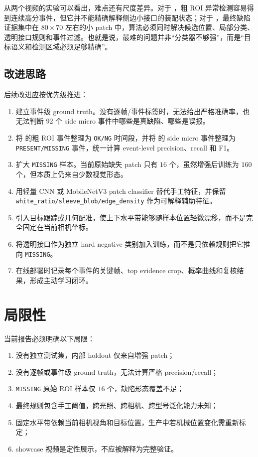 \documentclass[a4paper,12pt]{article}
\newcommand{\code}[1]{\texttt{#1}}
\begin{document}
从两个视频的实验可以看出，难点还有尺度差异。对于 ，粗 ROI 异常检测容易得到连续高分事件，但它并不能精确解释侧边小接口的装配状态；对于 ，最终缺陷证据集中在 $80\times70$ 左右的小 patch 中，算法必须同时解决候选位置、局部分类、透明接口规则和事件过滤。也就是说，最难的问题并非“分类器不够强”，而是“目标语义和检测区域必须足够精确”。

\subsection{改进思路}
后续改进应按优先级推进：
\begin{enumerate}[label=\arabic*.]
    \item 建立事件级 ground truth。没有逐帧/事件标签时，无法给出严格准确率，也无法判断 $92$ 个 side micro 事件中哪些是真缺陷、哪些是误报。
    \item 将  的粗 ROI 事件整理为 \code{OK/NG} 时间段，并将  的 side micro 事件整理为 \code{PRESENT/MISSING} 事件，统一计算 event-level precision、recall 和 F1。
    \item 扩大 \code{MISSING} 样本。当前原始缺失 patch 只有 $16$ 个，虽然增强后训练为 $160$ 个，但本质上仍来自少数视觉形态。
    \item 用轻量 CNN 或 MobileNetV3 patch classifier 替代手工特征，并保留 \code{white\_ratio/sleeve\_blob/edge\_density} 作为可解释辅助特征。
    \item 引入目标跟踪或几何配准，使上下水平带能够随样本位置轻微漂移，而不是完全固定在当前相机坐标。
    \item 将透明接口作为独立 hard negative 类别加入训练，而不是只依赖规则把它推向 \code{MISSING}。
    \item 在线部署时记录每个事件的关键帧、top evidence crop、概率曲线和复核结果，形成主动学习闭环。
\end{enumerate}

\section{局限性}
当前报告必须明确以下局限：
\begin{enumerate}[label=\arabic*.]
    \item 没有独立测试集，内部 holdout 仅来自增强 patch；
    \item 没有逐帧或事件级 ground truth，无法计算严格 precision/recall；
    \item \code{MISSING} 原始 ROI 样本仅 $16$ 个，缺陷形态覆盖不足；
    \item 最终规则包含手工阈值，跨光照、跨相机、跨型号泛化能力未知；
    \item 固定水平带依赖当前相机视角和目标位置，生产中若机械位置变化需重新标定；
    \item showcase 视频是定性展示，不应被解释为完整验证。
\end{enumerate}
\end{document}
